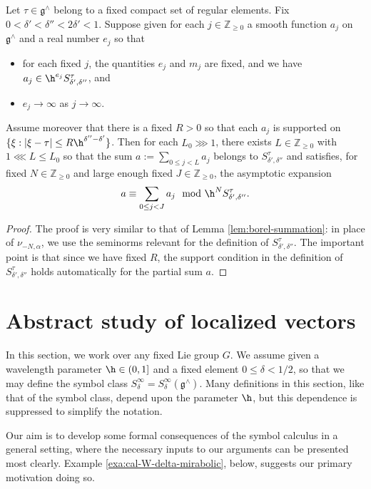 \begin{lemma}
  Let $\tau \in \mathfrak{g}^\wedge$ belong to a fixed compact set of regular elements.  Fix $0 < \delta ' < \delta '' < 2 \delta ' < 1$.  Suppose given for each $j \in \mathbb{Z}_{\geq 0}$ a smooth function $a_j$ on $\mathfrak{g}^\wedge$ and a real number $e_j$ so that
  \begin{itemize}
  \item for each fixed $j$, the quantities $e_j$ and $m_j$ are fixed, and we have $a_j \in \h^{e_j} S^{\tau}_{\delta', \delta ''}$, and
  \item $e_j \rightarrow \infty$ as $j \rightarrow \infty$.
  \end{itemize}
  Assume moreover that there is a fixed $R > 0$ so that each $a_j$ is supported on $\{\xi : |\xi - \tau| \leq R \h^{\delta '' - \delta '}\}$.  Then for each $L_0 \ggg 1$, there exists $L \in \mathbb{Z}_{\geq 0}$ with $1 \lll L \leq L_0$ so that the sum $a := \sum_{0 \leq j < L} a_j$ belongs to $S^{\tau}_{\delta', \delta ''}$ and satisfies, for fixed $N \in \mathbb{Z}_{\geq 0}$ and large enough fixed $J \in \mathbb{Z}_{\geq 0}$, the asymptotic expansion
  \[
    a \equiv \sum_{0 \leq j < J} a_j \mod{\h^N S^{\tau }_{\delta', \delta ''}}.
  \]
\end{lemma}
\begin{proof}
  The proof is very similar to that of Lemma \ref{lem:borel-summation}: in place of $\nu_{-N,\alpha}$, we use the seminorms relevant for the definition of $S^\tau_{\delta ', \delta ''}$.  The important point is that since we have fixed $R$, the support condition in the definition of $S_{\delta ', \delta ''}^{\tau}$ holds automatically for the partial sum $a$.
\end{proof}



\section{Abstract study of localized vectors}\label{sec:abstr-study-local}
In this section, we work over any fixed Lie group $G$.  We assume given a wavelength parameter $\h \in (0,1]$ and a fixed element $0 \leq \delta < 1/2$, so that we may define the symbol class $S_\delta^\infty = S_\delta^\infty(\mathfrak{g}^\wedge)$.  Many definitions in this section, like that of the symbol class, depend upon the parameter $\h$, but this dependence is suppressed to simplify the notation.

Our aim is to develop some formal consequences of the symbol calculus in a general setting, where the necessary inputs to our arguments can be presented most clearly.  Example \ref{exa:cal-W-delta-mirabolic}, below, suggests our primary motivation doing so.



